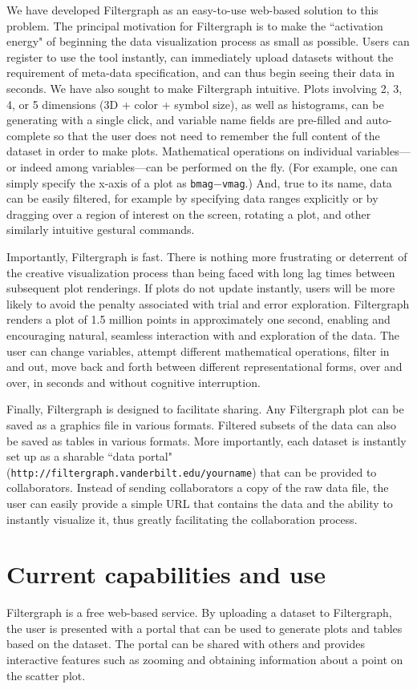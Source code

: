 We have developed Filtergraph as an easy-to-use web-based solution to
this problem. The principal motivation for Filtergraph is to make the
``activation energy" of beginning the data visualization process as small
as possible. Users can register to use the tool instantly, can immediately
upload datasets without the requirement of meta-data specification, and
can thus begin seeing their data in seconds. We have also sought to
make Filtergraph intuitive. Plots involving 2, 3, 4, or 5 dimensions (3D +
color + symbol size), as well as histograms, can be generating with a single
click, and variable name fields are pre-filled and auto-complete so that
the user does not need to remember the full content of the dataset in order
to make plots. Mathematical operations on individual variables---or indeed
among variables---can be performed on the fly. (For example, one can simply
specify the x-axis of a plot as {\tt bmag}$-${\tt vmag}.) 
And, true to its name, data
can be easily filtered, for example by specifying data ranges explicitly
or by dragging over a region of interest on the screen, rotating a plot,
and other similarly intuitive gestural commands.

Importantly, Filtergraph is fast. There is nothing more frustrating
or deterrent of the creative visualization process than being faced
with long lag times between subsequent plot renderings. If plots do not
update instantly, users will be more likely to avoid the penalty
associated with trial and error exploration. Filtergraph renders a plot
of 1.5 million points in approximately one second, enabling and encouraging
natural, seamless interaction with and exploration of the data. The user
can change variables, attempt different mathematical operations, filter
in and out, move back and forth between different representational forms,
over and over, in seconds and without cognitive interruption.

Finally, Filtergraph is designed to facilitate sharing. Any Filtergraph plot
can be saved as a graphics file in various formats. Filtered subsets of
the data can also be saved as tables in various formats. More importantly,
each dataset is instantly set up as a sharable ``data portal" ({\tt http://filtergraph.vanderbilt.edu/yourname})
that can be provided to collaborators. Instead of sending collaborators a copy of
the raw data file, the user can easily provide a simple URL that contains the
data and the ability to instantly visualize it, thus greatly facilitating the collaboration process.

\section{Current capabilities and use}
Filtergraph is a free web-based service. By uploading a
dataset to Filtergraph, the user is presented with a portal that can be used to generate
plots and tables based on the dataset. The portal can be shared with others
and provides interactive features such as zooming and obtaining information
about a point on the scatter plot.

